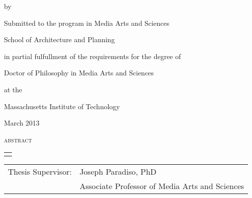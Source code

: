 \thispagestyle{empty}

\begingroup
\let\clearpage\relax
\let\cleardoublepage\relax
\let\cleardoublepage\relax

\begin{addmargin}[1cm]{-3cm}
\begin{samepage}
{\centering

    \begingroup
        \color{Maroon}
        {\Large\textsc{\myTitle}}
    \endgroup

    by

    \myName

    \vspace{4mm}

Submitted to the program in Media Arts and Sciences

School of Architecture and Planning

    \vspace{2mm}

in partial fulfullment of the requirements for the degree of

    \vspace{2mm}

Doctor of Philosophy in Media Arts and Sciences

at the

Massachusetts Institute of Technology

    \vspace{2mm}

March 2013



}

{\Large{\textsc{abstract}}}

\begin{tabular}{p{12cm}}
\hline\\
\end{tabular}


{\small

}

\vspace{4mm}
\noindent
\begin{tabular}{rl}
Thesis Supervisor:&Joseph Paradiso, PhD\\
                  &Associate Professor of Media Arts and Sciences
\end{tabular}

\end{samepage}

\end{addmargin}
\endgroup


